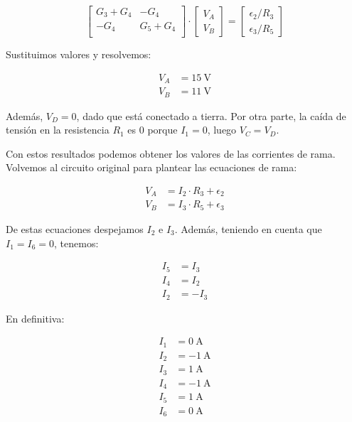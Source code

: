 \begin{equation*}
  \begin{bmatrix}
    G_3 + G_4 & -G_4\\
    -G_4 & G_5 + G_4\\
  \end{bmatrix} \cdot %
  \begin{bmatrix}
    V_A\\
    V_B
  \end{bmatrix} = %
  \begin{bmatrix}
    \epsilon_2/R_3\\
    \epsilon_3/R_5
  \end{bmatrix}
\end{equation*}

Sustituimos valores y resolvemos:

\begin{align*}
  V_A &= \qty{15}{\volt}\\
  V_B &= \qty{11}{\volt}
\end{align*}

Además, $V_D = 0$, dado que está conectado a tierra. Por otra parte, la caída de tensión en la resistencia $R_1$ es 0 porque $I_1 = 0$, luego $V_C = V_D$.

Con estos resultados podemos obtener los valores de las corrientes de rama. Volvemos al circuito original para plantear las ecuaciones de rama:

\begin{align*}
  V_A &= I_2 \cdot R_3 + \epsilon_2\\
  V_B &= I_3 \cdot R_5 + \epsilon_3
\end{align*}

De estas ecuaciones despejamos $I_2$ e $I_3$. Además, teniendo en cuenta que $I_1 = I_6 = 0$, tenemos:

\begin{align*}
  I_5 &= I_3\\
  I_4 &= I_2\\
  I_2 &= -I_3
\end{align*}

En definitiva:

\begin{align*}
  I_1 &= \qty{0}{\ampere}\\
  I_2 &= \qty{-1}{\ampere}\\
  I_3 &= \qty{1}{\ampere}\\
  I_4 &= \qty{-1}{\ampere}\\
  I_5 &= \qty{1}{\ampere}\\
  I_6 &= \qty{0}{\ampere}
\end{align*}


